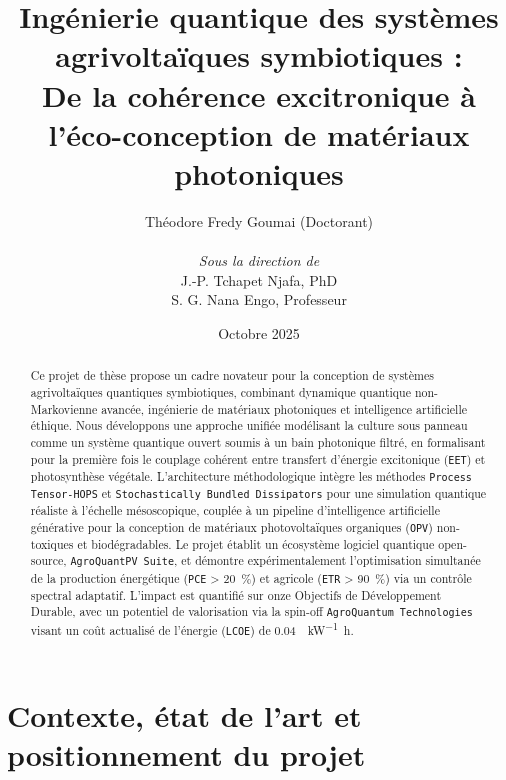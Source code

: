 \documentclass[12pt, a4paper]{article}
\begin{document}
\title{\huge Ingénierie quantique des systèmes agrivoltaïques symbiotiques :\\ De la cohérence excitronique à l'éco-conception de matériaux photoniques}
\author{
    Théodore Fredy Goumai (Doctorant) \\
    \\
    \textit{Sous la direction de} \\
    J.-P. Tchapet Njafa, PhD \\
    S. G. Nana Engo, Professeur
}
\date{Octobre 2025}

\maketitle
\thispagestyle{empty}
\newpage

\begin{abstract}
Ce projet de thèse propose un cadre novateur pour la conception de systèmes agrivoltaïques quantiques symbiotiques, combinant dynamique quantique non-Markovienne avancée, ingénierie de matériaux photoniques et intelligence artificielle éthique. Nous développons une approche unifiée modélisant la culture sous panneau comme un système quantique ouvert soumis à un bain photonique filtré, en formalisant pour la première fois le couplage cohérent entre transfert d'énergie excitonique (\texttt{EET}) et photosynthèse végétale. L'architecture méthodologique intègre les méthodes \texttt{Process Tensor-HOPS} et \texttt{Stochastically Bundled Dissipators} pour une simulation quantique réaliste à l'échelle mésoscopique, couplée à un pipeline d'intelligence artificielle générative pour la conception de matériaux photovoltaïques organiques (\texttt{OPV}) non-toxiques et biodégradables. Le projet établit un écosystème logiciel quantique open-source, \texttt{AgroQuantPV Suite}, et démontre expérimentalement l'optimisation simultanée de la production énergétique (\texttt{PCE} > \SI{20}{\percent}) et agricole (\texttt{ETR} > \SI{90}{\percent}) via un contrôle spectral adaptatif. L'impact est quantifié sur onze Objectifs de Développement Durable, avec un potentiel de valorisation via la spin-off \texttt{AgroQuantum Technologies} visant un coût actualisé de l'énergie (\texttt{LCOE}) de \SI{0.04}{\dollar\per\kilo\watt\hour}.
\end{abstract}
\newpage

\tableofcontents
\newpage
\setcounter{page}{1}

\section{Contexte, état de l'art et positionnement du projet}
\end{document}
